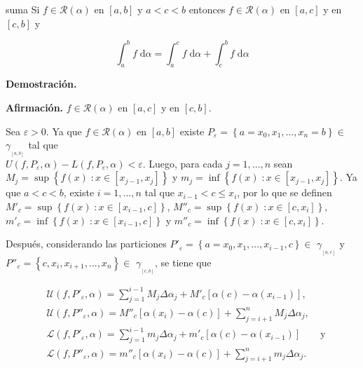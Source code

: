 \documentclass[12pt]{article}
\newenvironment{ejercicio}[1]{\begin{ejer}[breakable, pad at break = 5mm, leftrule = 0.7mm, rightrule = 0.7mm, right = 2mm, left = 2mm, enlarge bottom finally by = 3mm, fontlower = \setlength{\parskip}{2mm}]{}{#1}}{\end{ejer}}
\newcommand{\talque}{\; \mathbf{\colon}}
\newcommand{\rsi}[1]{\mathcal{R}(#1)}
\begin{document}

	\begin{ejercicio}{suma}
		Si $ f \in \rsi{\alpha} $ en $ [a,b] $ y $ a < c < b $ entonces $ f \in \rsi{\alpha} $ en $ [a,c] $ y en $ [c,b] $ y

		\begin{equation*}
			\int_{a}^{b} f \; \mathrm{d} \alpha = \int_{a}^{c} f \; \mathrm{d} \alpha + \int_{c}^{b} f \; \mathrm{d} \alpha
		\end{equation*}

		\tcblower

		\textbf{Demostración.} 

		\textbf{Afirmación.} $ f \in \rsi{\alpha} $ en $ [a,c] $ y en $ [c,b] $.

		Sea $ \varepsilon > 0 $. Ya que $ f \in \rsi{\alpha} $ en $ [a,b] $ existe $ P_\varepsilon = \left\lbrace a = x_0, x_1, \ldots, x_n = b \right\rbrace \in $ {\large $ \gamma_{_{[a,b]}} $} tal que \\ $ U(f,P_\varepsilon,\alpha) - L(f,P_\varepsilon,\alpha) < \varepsilon $. Luego, para cada $ j = 1, \ldots, n $ sean $ M_j = \sup \left\lbrace f(x) \talque x \in \left[ x_{j-1}, x_j \right] \right\rbrace $ y $ m_j = \inf \left\lbrace f(x) \talque x \in \left[ x_{j-1}, x_j \right] \right\rbrace $. Ya que $ a < c < b $, existe $ i = 1, \ldots, n $ tal que $ x_{i-1} < c \leq x_i $, por lo que se definen $ M'_c = \sup \left\lbrace f(x) \talque x \in \left[ x_{i-1}, c \right] \right\rbrace $, $ M''_c = \sup \left\lbrace f(x) \talque x \in \left[ c, x_i \right] \right\rbrace $, $ m'_c = \inf \left\lbrace f(x) \talque x \in \left[ x_{i-1}, c \right] \right\rbrace $ y $ m''_c = \inf \left\lbrace f(x) \talque x \in \left[ c, x_i \right] \right\rbrace $.

		Después, considerando las particiones $ P'_\varepsilon = \left\lbrace a = x_0, x_1, \ldots, x_{i-1}, c \right\rbrace \in $ {\large $ \gamma_{_{[a,c]}} $} y \\ $ P''_\varepsilon = \left\lbrace c, x_i, x_{i+1}, \ldots, x_n \right\rbrace \in $ {\large $ \gamma_{_{[c,b]}} $}, se tiene que
		
		\begin{align*}
			&\mathcal{U} \left( f, P'_\varepsilon, \alpha \right) = \sum_{j=1}^{i-1} M_j \Delta \alpha_j + M'_c \left[ \alpha(c) - \alpha\left( x_{i-1} \right) \right], \\
			&\mathcal{U} \left( f, P''_\varepsilon, \alpha \right) = M''_c \left[ \alpha(x_i) - \alpha\left( c \right) \right] + \sum_{j=i+1}^{n} M_j \Delta \alpha_j, \\
			&\mathcal{L} \left( f, P'_\varepsilon, \alpha \right) = \sum_{j=1}^{i-1} m_j \Delta \alpha_j + m'_c \left[ \alpha(c) - \alpha\left( x_{i-1} \right) \right] \qquad \mbox{y} \\
			&\mathcal{L} \left( f, P''_\varepsilon, \alpha \right) = m''_c \left[ \alpha(x_i) - \alpha\left( c \right) \right] + \sum_{j=i+1}^{n} m_j \Delta \alpha_j.
		\end{align*}


\end{ejercicio}
\end{document}
